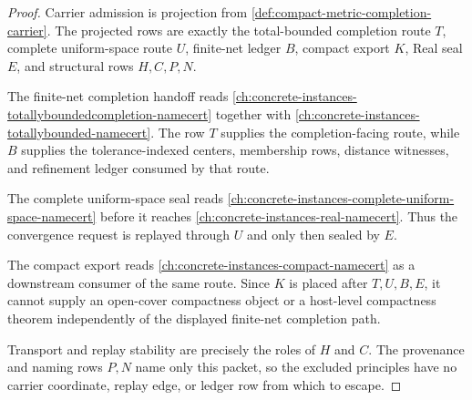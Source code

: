 \begin{proof}
Carrier admission is projection from \autoref{def:compact-metric-completion-carrier}. The projected rows are exactly the total-bounded completion route $T$, complete uniform-space route $U$, finite-net ledger $B$, compact export $K$, Real seal $E$, and structural rows $H,C,P,N$.

The finite-net completion handoff reads \autoref{ch:concrete-instances-totallyboundedcompletion-namecert} together with \autoref{ch:concrete-instances-totallybounded-namecert}. The row $T$ supplies the completion-facing route, while $B$ supplies the tolerance-indexed centers, membership rows, distance witnesses, and refinement ledger consumed by that route.

The complete uniform-space seal reads \autoref{ch:concrete-instances-complete-uniform-space-namecert} before it reaches \autoref{ch:concrete-instances-real-namecert}. Thus the convergence request is replayed through $U$ and only then sealed by $E$.

The compact export reads \autoref{ch:concrete-instances-compact-namecert} as a downstream consumer of the same route. Since $K$ is placed after $T,U,B,E$, it cannot supply an open-cover compactness object or a host-level compactness theorem independently of the displayed finite-net completion path.

Transport and replay stability are precisely the roles of $H$ and $C$. The provenance and naming rows $P,N$ name only this packet, so the excluded principles have no carrier coordinate, replay edge, or ledger row from which to escape.
\end{proof}

